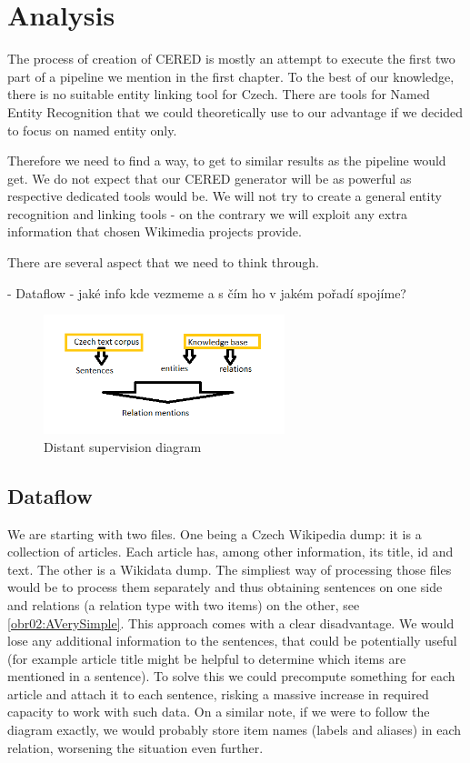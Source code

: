 
\section{Analysis}

The process of creation of CERED is mostly an attempt to execute the first two part of a pipeline we mention in the first chapter. To the best of our knowledge, there is no suitable entity linking tool for Czech. There are tools for Named Entity Recognition that we could theoretically use to our advantage if we decided to focus on named entity only.

Therefore we need to find a way, to get to similar results as the pipeline would get. We do not expect that our CERED generator will be as powerful as respective dedicated tools would be. We will not try to create a general entity recognition and linking tools - on the contrary we will exploit any extra information that chosen Wikimedia projects provide. 

There are several aspect that we need to think through. 

- Dataflow - jaké info kde vezmeme a s čím ho v jakém pořadí spojíme?


\begin{figure}[h]\centering
\includegraphics[width=70mm]{./img/Distant}
\caption{Distant supervision diagram}
\label{obr03:Nhust}
\end{figure}

\subsection{Dataflow}

We are starting with two files. One being a Czech Wikipedia dump: it is a collection of articles. Each article has, among other information, its title, id and text. The other is a Wikidata dump. The simpliest way of processing those files would be to process them separately and thus obtaining sentences on one side and relations (a relation type with two items) on the other, see \ref{obr02:AVerySimple}. This approach comes with a clear disadvantage. We would lose any additional information to the sentences, that could be potentially useful (for example article title might be helpful to determine which items are mentioned in a sentence). To solve this we could precompute something for each article and attach it to each sentence, risking a massive increase in required capacity to work with such data. On a similar note, if we were to follow the diagram exactly, we would probably store item names (labels and aliases) in each relation, worsening the situation even further.



